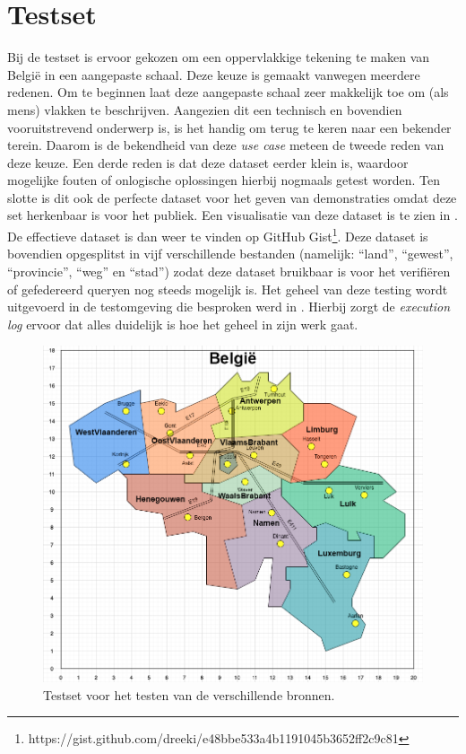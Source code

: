 \section{Testset}
\label{sec:testset}
Bij de testset is ervoor gekozen om een oppervlakkige tekening te maken van België in een aangepaste schaal. Deze keuze is gemaakt vanwegen meerdere redenen. Om te beginnen laat deze aangepaste schaal zeer makkelijk toe om (als mens) vlakken te beschrijven. Aangezien dit een technisch en bovendien vooruitstrevend onderwerp is, is het handig om terug te keren naar een bekender terein. Daarom is de bekendheid van deze \textit{use case} meteen de tweede reden van deze keuze. Een derde reden is dat deze dataset eerder klein is, waardoor mogelijke fouten of onlogische oplossingen hierbij nogmaals getest worden. Ten slotte is dit ook de perfecte dataset voor het geven van demonstraties omdat deze set herkenbaar is voor het publiek. Een visualisatie van deze dataset is te zien in . De effectieve dataset is dan weer te vinden op GitHub Gist\footnote{https://gist.github.com/dreeki/e48bbe533a4b1191045b3652ff2c9c81}. Deze dataset is bovendien opgesplitst in vijf verschillende bestanden (namelijk: ``land'', ``gewest'', ``provincie'', ``weg'' en ``stad'') zodat deze dataset bruikbaar is voor het verifiëren of gefedereerd queryen nog steeds mogelijk is. Het geheel van deze testing wordt uitgevoerd in de testomgeving die besproken werd in . Hierbij zorgt de \textit{execution log} ervoor dat alles duidelijk is hoe het geheel in zijn werk gaat.

\begin{figure}
    \centering
    \includegraphics[width=\linewidth]{images/geosparql_demo.png}
    \caption{Testset voor het testen van de verschillende bronnen.}
    \label{fig:demoset}
\end{figure}


